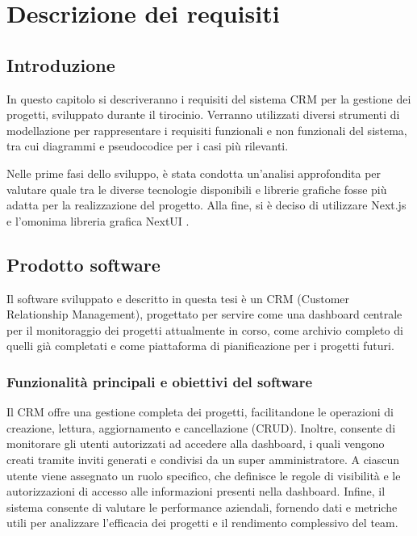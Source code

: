 \documentclass[target=bach,aauheader=,style=]{thud}
\begin{document}
\chapter{Descrizione dei requisiti}\label{chapter_4}

\section{Introduzione}
In questo capitolo si descriveranno i requisiti del sistema CRM per la gestione dei progetti, sviluppato durante il tirocinio. Verranno utilizzati diversi strumenti di modellazione per rappresentare i requisiti funzionali e non funzionali del sistema, tra cui diagrammi e pseudocodice per i casi più rilevanti.

\noindent Nelle prime fasi dello sviluppo, è stata condotta un'analisi approfondita per valutare quale tra le diverse tecnologie disponibili e librerie grafiche fosse più adatta per la realizzazione del progetto. Alla fine, si è deciso di utilizzare Next.js \cite{nextjs2024} e l'omonima libreria grafica NextUI \cite{nextui2024}. 

\section{Prodotto software}
Il software sviluppato e descritto in questa tesi è un CRM (Customer Relationship Management), progettato per servire come una dashboard centrale per il monitoraggio dei progetti attualmente in corso, come archivio completo di quelli già completati e come piattaforma di pianificazione per i progetti futuri.

\subsection{Funzionalità principali e obiettivi del software}
Il CRM offre una gestione completa dei progetti, facilitandone le operazioni di creazione, lettura, aggiornamento e cancellazione (CRUD). Inoltre, consente di monitorare gli utenti autorizzati ad accedere alla dashboard, i quali vengono creati tramite inviti generati e condivisi da un super amministratore. A ciascun utente viene assegnato un ruolo specifico, che definisce le regole di visibilità e le autorizzazioni di accesso alle informazioni presenti nella dashboard. Infine, il sistema consente di valutare le performance aziendali, fornendo dati e metriche utili per analizzare l'efficacia dei progetti e il rendimento complessivo del team.
\end{document}
